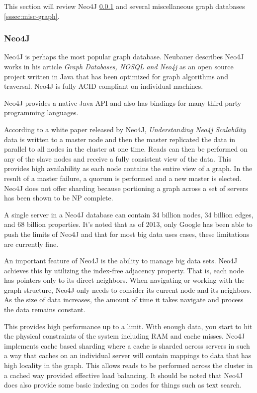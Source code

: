 \documentclass[]{article}
\begin{document}
This section will review Neo4J \ref{sssec:neo4j} and several miscellaneous graph databases \ref{sssec:misc-graph}. 

\subsubsection{Neo4J}\label{sssec:neo4j}
Neo4J is perhaps the most popular graph database. Neubauer describes Neo4J works in his article \textit{Graph Databases, NOSQL and Neo4j}\cite{neubauer_2010} as an open source project written in Java that has been optimized for graph algorithms and traversal. Neo4J is fully ACID compliant on individual machines.

Neo4J provides a native Java API and also has bindings for many third party programming languages.

According to a white paper released by Neo4J, \textit{Understanding Neo4j Scalability}\cite{montag2013understanding} data is written to a master node and then the master replicated the data in parallel to all nodes in the cluster at one time. Reads can then be performed on any of the slave nodes and receive a fully consistent view of the data. This provides high availability as each node contains the entire view of a graph. In the result of a master failure, a quorum is performed and a new master is elected. Neo4J does not offer sharding because portioning a graph across a set of servers has been shown to be NP complete.

A single server in a Neo4J database can contain 34 billion nodes, 34 billion edges, and 68 billion properties. It's noted that as of 2013, only Google has been able to push the limits of Neo4J and that for most big data uses cases, these limitations are currently fine.

An important feature of Neo4J is the ability to manage big data sets. Neo4J achieves this by utilizing the index-free adjacency property. That is, each node has pointers only to its direct neighbors. When navigating or working with the graph structure, Neo4J only needs to consider its current node and its neighbors. As the size of data increases, the amount of time it takes navigate and process the data remains constant. 

This provides high performance up to a limit. With enough data, you start to hit the physical constraints of the system including RAM and cache misses. Neo4J implements cache based sharding where a cache is sharded across servers in such a way that caches on an individual server will contain mappings to data that has high locality in the graph. This allows reads to be performed across the cluster in a cached way provided effective load balancing. It should be noted that Neo4J does also provide some basic indexing on nodes for things such as text search.
\end{document}
